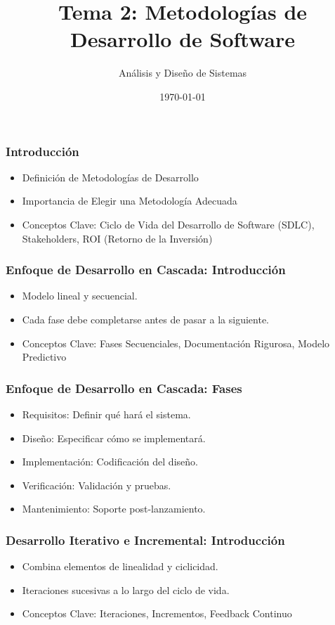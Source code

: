 \documentclass[aspectratio=169]{beamer}
\begin{document}
\title{Tema 2: Metodologías de Desarrollo de Software}
\author{Análisis y Diseño de Sistemas}
\date{\today}

\begin{frame}
	\titlepage
\end{frame}

\begin{frame}
	\frametitle{Introducción}
	\begin{itemize}
		\item Definición de Metodologías de Desarrollo
		\item Importancia de Elegir una Metodología Adecuada
		\item Conceptos Clave: Ciclo de Vida del Desarrollo de Software (SDLC), Stakeholders, ROI (Retorno de la Inversión)
	\end{itemize}
\end{frame}

\begin{frame}
	\frametitle{Enfoque de Desarrollo en Cascada: Introducción}
	\begin{itemize}
		\item Modelo lineal y secuencial.
		\item Cada fase debe completarse antes de pasar a la siguiente.
		\item Conceptos Clave: Fases Secuenciales, Documentación Rigurosa, Modelo Predictivo
	\end{itemize}
\end{frame}

\begin{frame}
	\frametitle{Enfoque de Desarrollo en Cascada: Fases}
	\begin{itemize}
		\item Requisitos: Definir qué hará el sistema.
		\item Diseño: Especificar cómo se implementará.
		\item Implementación: Codificación del diseño.
		\item Verificación: Validación y pruebas.
		\item Mantenimiento: Soporte post-lanzamiento.
	\end{itemize}
\end{frame}

\begin{frame}
	\frametitle{Desarrollo Iterativo e Incremental: Introducción}
	\begin{itemize}
		\item Combina elementos de linealidad y ciclicidad.
		\item Iteraciones sucesivas a lo largo del ciclo de vida.
		\item Conceptos Clave: Iteraciones, Incrementos, Feedback Continuo
	\end{itemize}
\end{frame}
\end{document}
